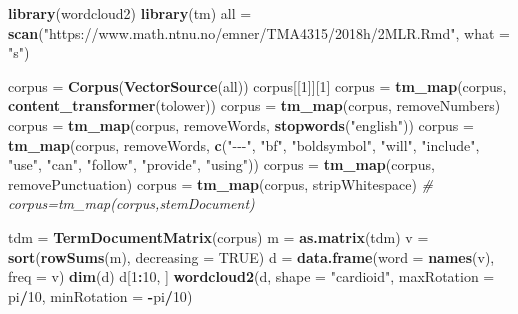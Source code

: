 \documentclass[
]{article}
\newenvironment{Shaded}{\begin{snugshade}}{\end{snugshade}}
\newcommand{\AttributeTok}[1]{\textcolor[rgb]{0.13,0.29,0.53}{#1}}
\newcommand{\CommentTok}[1]{\textcolor[rgb]{0.56,0.35,0.01}{\textit{#1}}}
\newcommand{\ConstantTok}[1]{\textcolor[rgb]{0.56,0.35,0.01}{#1}}
\newcommand{\DecValTok}[1]{\textcolor[rgb]{0.00,0.00,0.81}{#1}}
\newcommand{\FunctionTok}[1]{\textcolor[rgb]{0.13,0.29,0.53}{\textbf{#1}}}
\newcommand{\NormalTok}[1]{#1}
\newcommand{\OtherTok}[1]{\textcolor[rgb]{0.56,0.35,0.01}{#1}}
\newcommand{\SpecialCharTok}[1]{\textcolor[rgb]{0.81,0.36,0.00}{\textbf{#1}}}
\newcommand{\StringTok}[1]{\textcolor[rgb]{0.31,0.60,0.02}{#1}}
\begin{document}
\begin{Shaded}
\begin{Highlighting}[]
\FunctionTok{library}\NormalTok{(wordcloud2)}
\FunctionTok{library}\NormalTok{(tm)}
\NormalTok{all }\OtherTok{=} \FunctionTok{scan}\NormalTok{(}\StringTok{"https://www.math.ntnu.no/emner/TMA4315/2018h/2MLR.Rmd"}\NormalTok{, }\AttributeTok{what =} \StringTok{"s"}\NormalTok{)}

\NormalTok{corpus }\OtherTok{=} \FunctionTok{Corpus}\NormalTok{(}\FunctionTok{VectorSource}\NormalTok{(all))}
\NormalTok{corpus[[}\DecValTok{1}\NormalTok{]][}\DecValTok{1}\NormalTok{]}
\NormalTok{corpus }\OtherTok{=} \FunctionTok{tm\_map}\NormalTok{(corpus, }\FunctionTok{content\_transformer}\NormalTok{(tolower))}
\NormalTok{corpus }\OtherTok{=} \FunctionTok{tm\_map}\NormalTok{(corpus, removeNumbers)}
\NormalTok{corpus }\OtherTok{=} \FunctionTok{tm\_map}\NormalTok{(corpus, removeWords, }\FunctionTok{stopwords}\NormalTok{(}\StringTok{"english"}\NormalTok{))}
\NormalTok{corpus }\OtherTok{=} \FunctionTok{tm\_map}\NormalTok{(corpus, removeWords, }\FunctionTok{c}\NormalTok{(}\StringTok{"{-}{-}{-}"}\NormalTok{, }\StringTok{"bf"}\NormalTok{, }\StringTok{"boldsymbol"}\NormalTok{, }\StringTok{"will"}\NormalTok{,}
    \StringTok{"include"}\NormalTok{, }\StringTok{"use"}\NormalTok{, }\StringTok{"can"}\NormalTok{, }\StringTok{"follow"}\NormalTok{, }\StringTok{"provide"}\NormalTok{, }\StringTok{"using"}\NormalTok{))}
\NormalTok{corpus }\OtherTok{=} \FunctionTok{tm\_map}\NormalTok{(corpus, removePunctuation)}
\NormalTok{corpus }\OtherTok{=} \FunctionTok{tm\_map}\NormalTok{(corpus, stripWhitespace)}
\CommentTok{\# corpus=tm\_map(corpus,stemDocument)}

\NormalTok{tdm }\OtherTok{=} \FunctionTok{TermDocumentMatrix}\NormalTok{(corpus)}
\NormalTok{m }\OtherTok{=} \FunctionTok{as.matrix}\NormalTok{(tdm)}
\NormalTok{v }\OtherTok{=} \FunctionTok{sort}\NormalTok{(}\FunctionTok{rowSums}\NormalTok{(m), }\AttributeTok{decreasing =} \ConstantTok{TRUE}\NormalTok{)}
\NormalTok{d }\OtherTok{=} \FunctionTok{data.frame}\NormalTok{(}\AttributeTok{word =} \FunctionTok{names}\NormalTok{(v), }\AttributeTok{freq =}\NormalTok{ v)}
\FunctionTok{dim}\NormalTok{(d)}
\NormalTok{d[}\DecValTok{1}\SpecialCharTok{:}\DecValTok{10}\NormalTok{, ]}
\FunctionTok{wordcloud2}\NormalTok{(d, }\AttributeTok{shape =} \StringTok{"cardioid"}\NormalTok{, }\AttributeTok{maxRotation =}\NormalTok{ pi}\SpecialCharTok{/}\DecValTok{10}\NormalTok{, }\AttributeTok{minRotation =} \SpecialCharTok{{-}}\NormalTok{pi}\SpecialCharTok{/}\DecValTok{10}\NormalTok{)}
\end{Highlighting}
\end{Shaded}
\end{document}
